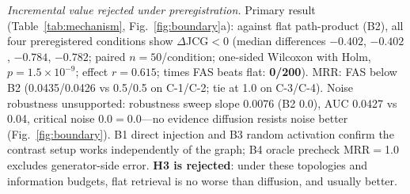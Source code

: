 \documentclass[10pt,a4paper]{article}
\begin{document}
\emph{Incremental value rejected under preregistration.} Primary result (Table~\ref{tab:mechanism}, Fig.~\ref{fig:boundary}a): against flat path-product (B2), all four preregistered conditions show $\Delta$JCG${<}0$ (median differences ${-}0.402$, ${-}0.402$, ${-}0.784$, ${-}0.782$; paired $n{=}50$/condition; one-sided Wilcoxon with Holm, $p{=}1.5\times10^{-9}$; effect $r{=}0.615$; times FAS beats flat: \textbf{0/200}). MRR: FAS below B2 (0.0435/0.0426 vs 0.5/0.5 on C-1/C-2; tie at 1.0 on C-3/C-4). Noise robustness unsupported: robustness sweep slope 0.0076 (B2 0.0), AUC 0.0427 vs 0.04, critical noise 0.0$=$0.0---no evidence diffusion resists noise better (Fig.~\ref{fig:boundary}). B1 direct injection and B3 random activation confirm the contrast setup works independently of the graph; B4 oracle precheck MRR$=$1.0 excludes generator-side error. \textbf{H3 is rejected}: under these topologies and information budgets, flat retrieval is no worse than diffusion, and usually better.
\end{document}
